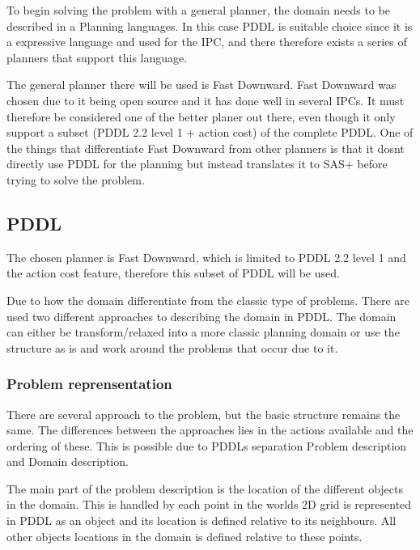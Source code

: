 	To begin solving the problem with a general planner, the domain needs to be described in a Planning languages. In this case PDDL is suitable choice since it is a expressive language and used for the IPC, and there therefore exists a series of planners that support this language.
 
	  
	
	The general planner there will be used is Fast Downward. Fast Downward was chosen due to it being open source and it has done well in several IPCs. It must therefore be considered one of the better planer out there, even though it only support a subset (PDDL 2.2 level 1 + action cost) of the complete PDDL.
	One of the things that differentiate Fast Downward from other planners is that it dosnt directly use PDDL for the planning but instead translates it to SAS+ before trying to solve the problem. 
 
 \subsection{PDDL}
	The chosen planner is Fast Downward, which is limited to PDDL 2.2 level 1 and the action cost feature, therefore this subset of PDDL will be used.

	Due to how the domain differentiate from the classic type of problems. There are used two different approaches to describing the domain in PDDL. The domain can either be transform/relaxed into a more classic planning domain or use the structure as is and work around the problems that occur due to it.
	
		\subsubsection{Problem reprensentation}
		There are several approach to the problem, but the basic structure remains the same. The differences between the approaches lies in the actions available and the ordering of these. This is possible due to PDDLs separation Problem description and Domain description.
		
		The main part of the problem description is the location of the different objects in the domain. This is handled by each point in the worlds 2D grid is represented in PDDL as an object and its location is defined relative to its neighbours. All other objects locations in the domain is defined relative to these points.
		
